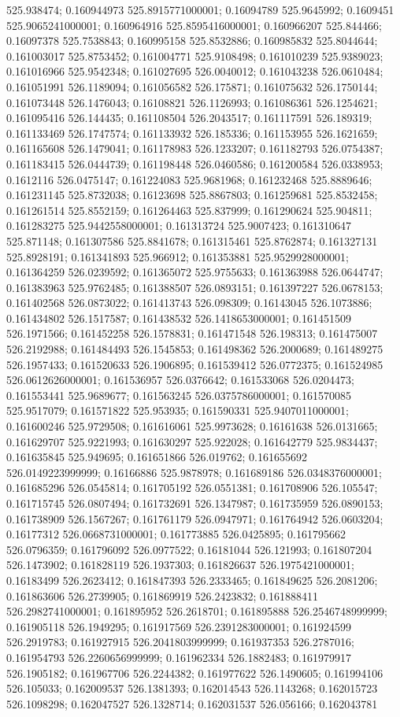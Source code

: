 525.938474; 0.160944973 525.8915771000001; 0.16094789 525.9645992; 0.1609451 525.9065241000001; 0.160964916 525.8595416000001; 0.160966207 525.844466; 0.16097378 525.7538843; 0.160995158 525.8532886; 0.160985832 525.8044644; 0.161003017 525.8753452; 0.161004771 525.9108498; 0.161010239 525.9389023; 0.161016966 525.9542348; 0.161027695 526.0040012; 0.161043238 526.0610484; 0.161051991 526.1189094; 0.161056582 526.175871; 0.161075632 526.1750144; 0.161073448 526.1476043; 0.16108821 526.1126993; 0.161086361 526.1254621; 0.161095416 526.144435; 0.161108504 526.2043517; 0.161117591 526.189319; 0.161133469 526.1747574; 0.161133932 526.185336; 0.161153955 526.1621659; 0.161165608 526.1479041; 0.161178983 526.1233207; 0.161182793 526.0754387; 0.161183415 526.0444739; 0.161198448 526.0460586; 0.161200584 526.0338953; 0.1612116 526.0475147; 0.161224083 525.9681968; 0.161232468 525.8889646; 0.161231145 525.8732038; 0.16123698 525.8867803; 0.161259681 525.8532458; 0.161261514 525.8552159; 0.161264463 525.837999; 0.161290624 525.904811; 0.161283275 525.9442558000001; 0.161313724 525.9007423; 0.161310647 525.871148; 0.161307586 525.8841678; 0.161315461 525.8762874; 0.161327131 525.8928191; 0.161341893 525.966912; 0.161353881 525.9529928000001; 0.161364259 526.0239592; 0.161365072 525.9755633; 0.161363988 526.0644747; 0.161383963 525.9762485; 0.161388507 526.0893151; 0.161397227 526.0678153; 0.161402568 526.0873022; 0.161413743 526.098309; 0.16143045 526.1073886; 0.161434802 526.1517587; 0.161438532 526.1418653000001; 0.161451509 526.1971566; 0.161452258 526.1578831; 0.161471548 526.198313; 0.161475007 526.2192988; 0.161484493 526.1545853; 0.161498362 526.2000689; 0.161489275 526.1957433; 0.161520633 526.1906895; 0.161539412 526.0772375; 0.161524985 526.0612626000001; 0.161536957 526.0376642; 0.161533068 526.0204473; 0.161553441 525.9689677; 0.161563245 526.0375786000001; 0.161570085 525.9517079; 0.161571822 525.953935; 0.161590331 525.9407011000001; 0.161600246 525.9729508; 0.161616061 525.9973628; 0.16161638 526.0131665; 0.161629707 525.9221993; 0.161630297 525.922028; 0.161642779 525.9834437; 0.161635845 525.949695; 0.161651866 526.019762; 0.161655692 526.0149223999999; 0.16166886 525.9878978; 0.161689186 526.0348376000001; 0.161685296 526.0545814; 0.161705192 526.0551381; 0.161708906 526.105547; 0.161715745 526.0807494; 0.161732691 526.1347987; 0.161735959 526.0890153; 0.161738909 526.1567267; 0.161761179 526.0947971; 0.161764942 526.0603204; 0.16177312 526.0668731000001; 0.161773885 526.0425895; 0.161795662 526.0796359; 0.161796092 526.0977522; 0.16181044 526.121993; 0.161807204 526.1473902; 0.161828119 526.1937303; 0.161826637 526.1975421000001; 0.16183499 526.2623412; 0.161847393 526.2333465; 0.161849625 526.2081206; 0.161863606 526.2739905; 0.161869919 526.2423832; 0.161888411 526.2982741000001; 0.161895952 526.2618701; 0.161895888 526.2546748999999; 0.161905118 526.1949295; 0.161917569 526.2391283000001; 0.161924599 526.2919783; 0.161927915 526.2041803999999; 0.161937353 526.2787016; 0.161954793 526.2260656999999; 0.161962334 526.1882483; 0.161979917 526.1905182; 0.161967706 526.2244382; 0.161977622 526.1490605; 0.161994106 526.105033; 0.162009537 526.1381393; 0.162014543 526.1143268; 0.162015723 526.1098298; 0.162047527 526.1328714; 0.162031537 526.056166; 0.162043781 